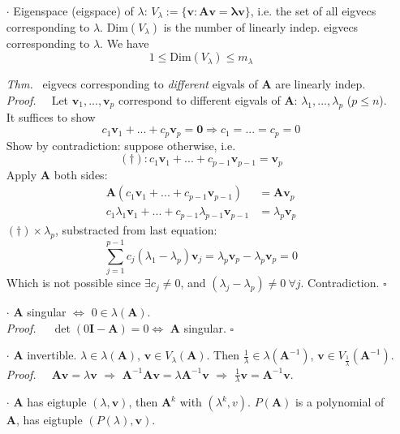 \documentclass[a4paper, 11pt]{article}
\newcommand{\boxwidth}{430pt}
\begin{document}
\begin{itemize}
  \item[$\cdot$] Eigenspace (eigspace) of $\lambda$: $V_{\lambda}:=\{\bm{v: \bm{A}\bm{v}=\lambda \bm{v}}\}$, i.e. the set of all eigvecs corresponding to $\lambda$. $\text{Dim}(V_{\lambda})$ is the number of linearly indep. eigvecs corresponding to $\lambda$. We have
  $$
  1\leq \text{Dim}(V_{\lambda})\leq m_{\lambda}
  $$
  \item[\textit{Thm.~}] eigvecs corresponding to \textit{different} eigvals of $\bm{A}$ are linearly indep.\\
  \textit{Proof.~~} Let $\bm{v}_1, ..., \bm{v}_p$ correspond to different eigvals of $\bm{A}$: $\lambda_1, ..., \lambda_p$ ($p\leq n$).\\
  It suffices to show
  $$
  c_1 \bm{v}_1 + ... + c_p \bm{v}_p= \bm{0} \Rightarrow c_1=...=c_p=0
  $$
  Show by contradiction: suppose otherwise, i.e. 
  $$
  (\dag): c_1 \bm{v}_1 + ... + c_{p-1} \bm{v}_{p-1}= \bm{v}_p
  $$
  Apply $\bm{A}$ both sides:
  \begin{equation}
  \begin{split}
    \bm{A}(c_1 \bm{v}_1 + ... + c_{p-1} \bm{v}_{p-1}) &= \bm{A} \bm{v}_p\\
    c_1 \lambda_1 \bm{v}_1 + ... + c_{p-1} \lambda_{p-1} \bm{v}_{p-1} &= \lambda_p \bm{v}_p
  \end{split}
  \end{equation}
  $(\dag)\times \lambda_p$, substracted from last equation:
  $$
  \sum_{j=1}^{p-1}c_j (\lambda_1 - \lambda_p)\bm{v}_j = \lambda_p \bm{v}_p - \lambda_p \bm{v}_p = 0
  $$
  Which is not possible since $\exists c_j \ne 0$, and $(\lambda_j - \lambda_p)\ne 0~\forall j$. Contradiction. $\square$
\end{itemize}

\begin{itemize}
  \item[$\cdot$] $\bm{A}$ singular $\iff$ $0\in \lambda(\bm{A})$.\\
  \textit{Proof.~~} $\det(0 \bm{I}-\bm{A})=0 \iff$ $\bm{A}$ singular. $\square$

  \item[$\cdot$] $\bm{A}$ invertible. $\lambda \in \lambda(\bm{A})$, $\bm{v}\in V_{\lambda}(\bm{A})$. Then $\frac{1}{\lambda}\in \lambda(\bm{A}^{-1})$, $\bm{v}\in V_{\frac{1}{\lambda}}(\bm{A}^{-1})$.\\
  \textit{Proof.~~} $\bm{Av}=\lambda \bm{v}$ $\Rightarrow$ $\bm{A}^{-1}\bm{Av} = \lambda \bm{A}^{-1} \bm{v}$ $\Rightarrow$ $\frac{1}{\lambda} \bm{v} = \bm{A}^{-1} \bm{v}$. 

  \item[$\cdot$] $\bm{A}$ has eigtuple $(\lambda, \bm{v})$, then $\bm{A}^k$ with $(\lambda^k, v)$. $P(\bm{A})$ is a polynomial of $\bm{A}$, has eigtuple $(P(\lambda), \bm{v})$.

\end{itemize}
\fbox{
	\parbox{\boxwidth}{
	1
	}
}
\end{document}
